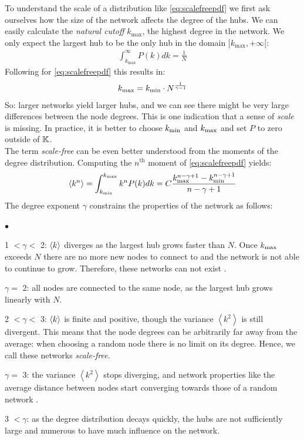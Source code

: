 To understand the scale of a distribution like \eqref{eq:scalefreepdf} we first ask ourselves how the size of the network affects the degree of the hubs. We can easily calculate the \textit{natural cutoff} $k_{\text{max}}$, the highest degree in the network. We only expect the largest hub to be the only hub in the domain $[k_{\text{max}}, +\infty[$:
\begin{align*}
\int_{k_{\text{max}}}^{\infty} P(k) dk=\frac{1}{N}
\end{align*}
Following \cite{BarabasiNetworkBook2016} for \eqref{eq:scalefreepdf} this results in:
\begin{align}
k_{\text{max}} = k_{\text{min}} \cdot N^{\frac{1}{\gamma-1}} \label{eq:scalefreecutoff}
\end{align}
So: larger networks yield larger hubs, and we can see there might be very large differences between the node degrees. This is one indication that a sense of \textsl{scale} is missing. In practice, it is better to choose $k_{\text{min}}$ and $k_{\text{max}}$ and set $P$ to zero outside of ${\mathbb{K}}$. \\

The term \textsl{scale-free} can be even better understood from the moments of the degree distribution. Computing the $n^{\text{th}}$ moment of \eqref{eq:scalefreepdf} yields:
\begin{align}
\left\langle k^{n}\right\rangle=\int_{\kmin}^{\kmax} k^{n} P(k) d k=C \frac{\kmax^{n-\gamma+1} - \kmin^{n-\gamma+1}}{n-\gamma+1}
\end{align}
The degree exponent $\gamma$ constrains the properties of the network as follows:
\begin{list}{$\bullet$}{}  
\item 1 $< \gamma <$ 2: ${\langle k\rangle}$ diverges as the largest hub grows faster than $N$. Once $k_{\text{max}}$ exceeds $N$ there are no more new nodes to connect to and the network is not able to continue to grow. Therefore, these networks can not exist \cite{Bassler2011, BarabasiNetworkBook2016}.
\item $\gamma =$ 2: all nodes are connected to the same node, as the largest hub grows linearly with $N$.
\item 2 $< \gamma < $ 3: ${\langle k\rangle}$ is finite and positive, though the variance $\left\langle k^{2}\right\rangle$ is still divergent. This means that the node degrees can be arbitrarily far away from the average: when choosing a random node there is no limit on its degree. Hence, we call these networks \textsl{scale-free}.
\item $ \gamma = $ 3: the variance $\left\langle k^{2}\right\rangle$ stops diverging, and network properties like the average distance between nodes start converging towards those of a random network \cite{BarabasiNetworkBook2016}.
\item 3 $< \gamma$: as the degree distribution decays quickly, the hubs are not sufficiently large and numerous to have much influence on the network. 
\end{list}

